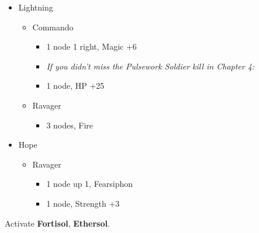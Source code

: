 \begin{menu}
	\begin{itemize}
		\crystarium
		\begin{itemize}
			\item Lightning
			      \begin{itemize}
				      \item Commando
				            \begin{itemize}
					            \item 1 node 1 right, Magic +6
                                \item \textit{If you didn't miss the Pulsework Soldier kill in Chapter 4:}
										\item 1 node, HP +25
				            \end{itemize}
				      \item Ravager
				            \begin{itemize}
					            \item 3 nodes, Fire
				            \end{itemize}
			      \end{itemize}
			\item Hope
			      \begin{itemize}
				      \item Ravager
				            \begin{itemize}
					            \item 1 node up 1, Fearsiphon
					            \item 1 node, Strength +3
				            \end{itemize}
			      \end{itemize}
		\end{itemize}
	\end{itemize}
\end{menu}
Activate \textbf{Fortisol}, \textbf{Ethersol}.
\vfill

